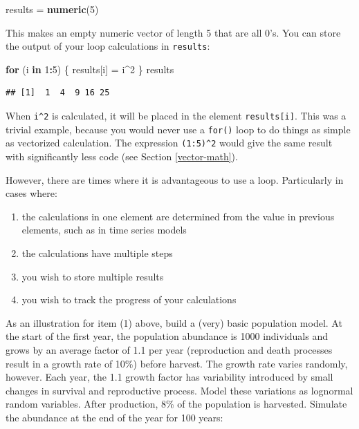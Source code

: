\documentclass[]{book}
\newenvironment{Shaded}{\begin{snugshade}}{\end{snugshade}}
\newcommand{\KeywordTok}[1]{\textcolor[rgb]{0.13,0.29,0.53}{\textbf{#1}}}
\newcommand{\DecValTok}[1]{\textcolor[rgb]{0.00,0.00,0.81}{#1}}
\newcommand{\StringTok}[1]{\textcolor[rgb]{0.31,0.60,0.02}{#1}}
\newcommand{\ControlFlowTok}[1]{\textcolor[rgb]{0.13,0.29,0.53}{\textbf{#1}}}
\newcommand{\OperatorTok}[1]{\textcolor[rgb]{0.81,0.36,0.00}{\textbf{#1}}}
\newcommand{\NormalTok}[1]{#1}
\providecommand{\tightlist}{%
  \setlength{\itemsep}{0pt}\setlength{\parskip}{0pt}}
\theoremstyle{definition}
\theoremstyle{definition}
\theoremstyle{definition}
\theoremstyle{remark}
\begin{document}
\begin{Shaded}
\begin{Highlighting}[]
\NormalTok{results =}\StringTok{ }\KeywordTok{numeric}\NormalTok{(}\DecValTok{5}\NormalTok{)}
\end{Highlighting}
\end{Shaded}

This makes an empty numeric vector of length 5 that are all 0's. You can
store the output of your loop calculations in \texttt{results}:

\begin{Shaded}
\begin{Highlighting}[]
\ControlFlowTok{for}\NormalTok{ (i }\ControlFlowTok{in} \DecValTok{1}\OperatorTok{:}\DecValTok{5}\NormalTok{) \{}
\NormalTok{  results[i] =}\StringTok{ }\NormalTok{i}\OperatorTok{^}\DecValTok{2}
\NormalTok{\}}
\NormalTok{results}
\end{Highlighting}
\end{Shaded}

\begin{verbatim}
## [1]  1  4  9 16 25
\end{verbatim}

When \texttt{i\^{}2} is calculated, it will be placed in the element
\texttt{results{[}i{]}}. This was a trivial example, because you would
never use a \texttt{for()} loop to do things as simple as vectorized
calculation. The expression \texttt{(1:5)\^{}2} would give the same
result with significantly less code (see Section \ref{vector-math}).

However, there are times where it is advantageous to use a loop.
Particularly in cases where:

\begin{enumerate}
\def\labelenumi{\arabic{enumi}.}
\tightlist
\item
  the calculations in one element are determined from the value in
  previous elements, such as in time series models
\item
  the calculations have multiple steps
\item
  you wish to store multiple results
\item
  you wish to track the progress of your calculations
\end{enumerate}

As an illustration for item (1) above, build a (very) basic population
model. At the start of the first year, the population abundance is 1000
individuals and grows by an average factor of 1.1 per year (reproduction
and death processes result in a growth rate of 10\%) before harvest. The
growth rate varies randomly, however. Each year, the 1.1 growth factor
has variability introduced by small changes in survival and reproductive
process. Model these variations as lognormal random variables. After
production, 8\% of the population is harvested. Simulate the abundance
at the end of the year for 100 years:
\end{document}
